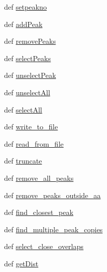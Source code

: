 \begin{DoxyCompactItemize}
\item 
def \hyperlink{classmy_peak_table_1_1my_peak_table_a5597961217d00620e9528fc283cdaa34}{setpeakno}
\item 
def \hyperlink{classmy_peak_table_1_1my_peak_table_a145f32c055bd6f844f0dc2eea559c7a1}{add\-Peak}
\item 
def \hyperlink{classmy_peak_table_1_1my_peak_table_af672cd80fa6edc133258f8d02a6066cd}{remove\-Peaks}
\item 
def \hyperlink{classmy_peak_table_1_1my_peak_table_abec9c6e424ad7d7fdd4d222dd48f4059}{select\-Peaks}
\item 
def \hyperlink{classmy_peak_table_1_1my_peak_table_ad1242828b8b1857958f477e816e53e50}{unselect\-Peak}
\item 
def \hyperlink{classmy_peak_table_1_1my_peak_table_a45c06af5936ee97b75fcb2f51c6f2809}{unselect\-All}
\item 
def \hyperlink{classmy_peak_table_1_1my_peak_table_a7f0337470250c257cd8b5492bb407a34}{select\-All}
\item 
def \hyperlink{classmy_peak_table_1_1my_peak_table_a9067cdbb5a19a158bcb515417be4c5d2}{write\-\_\-to\-\_\-file}
\item 
def \hyperlink{classmy_peak_table_1_1my_peak_table_accfb27ea1b0363b5bb88fcd0e9c211c6}{read\-\_\-from\-\_\-file}
\item 
def \hyperlink{classmy_peak_table_1_1my_peak_table_a27f05c63eb11d1ebc986d84b3ce82144}{truncate}
\item 
def \hyperlink{classmy_peak_table_1_1my_peak_table_ac19edb546ca91e7fce0bbb167ed19876}{remove\-\_\-all\-\_\-peaks}
\item 
def \hyperlink{classmy_peak_table_1_1my_peak_table_a048b6f02a598f8528b9e4a7a48c66d80}{remove\-\_\-peaks\-\_\-outside\-\_\-aa}
\item 
def \hyperlink{classmy_peak_table_1_1my_peak_table_a4c84d1c677df5d806a0fe898171f32dd}{find\-\_\-closest\-\_\-peak}
\item 
def \hyperlink{classmy_peak_table_1_1my_peak_table_af90e10c7f0a6286b59b47a801d630241}{find\-\_\-multiple\-\_\-peak\-\_\-copies}
\item 
def \hyperlink{classmy_peak_table_1_1my_peak_table_a0ecc469a4774f19b94bd986fe4033009}{select\-\_\-close\-\_\-overlaps}
\item 
def \hyperlink{classmy_peak_table_1_1my_peak_table_acd681ebee5454e3b2d99fdd0ddfdbd11}{get\-Dist}
\end{DoxyCompactItemize}

